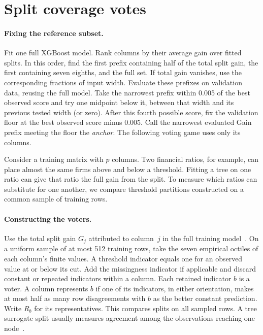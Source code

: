 \section{Split coverage votes}

\ifdefined\anchoredMinPI
\paragraph{Fixing the reference subset.}
Fit one full XGBoost model. Rank columns by their average gain over fitted splits. In this order, find the first prefix containing half of the total split gain, the first containing seven eighths, and the full set. If total gain vanishes, use the corresponding fractions of input width. Evaluate these prefixes on validation data, reusing the full model. Take the narrowest prefix within 0.005 of the best observed score and try one midpoint below it, between that width and its previous tested width (or zero). After this fourth possible score, fix the validation floor at the best observed score minus 0.005. Call the narrowest evaluated Gain prefix meeting the floor the \emph{anchor}. The following voting game uses only its columns.
\fi

Consider a training matrix with $p$ columns. Two financial ratios, for example, can place almost the same firms above and below a threshold. Fitting a tree on one ratio can give that ratio the full gain from the split. To measure which ratios can substitute for one another, we compare threshold partitions constructed on a common sample of training rows.

\paragraph{Constructing the voters.}
Use the total split gain $G_j$ attributed to column~$j$ in the full training model~\citep{chen2016xgboost}. On a uniform sample of at most 512 training rows, take the seven empirical octiles of each column's finite values. A threshold indicator equals one for an observed value at or below its cut. Add the missingness indicator if applicable and discard constant or repeated indicators within a column. Each retained indicator $b$ is a voter. A column represents $b$ if one of its indicators, in either orientation, makes at most half as many row disagreements with $b$ as the better constant prediction. Write $R_b$ for its representatives. This compares splits on all sampled rows. A tree surrogate split usually measures agreement among the observations reaching one node~\citep{seifert2019surrogate}.


